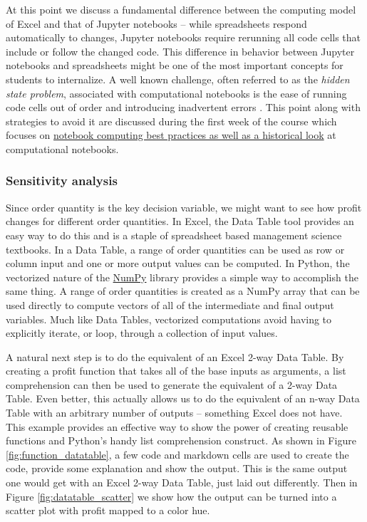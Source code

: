 \documentclass[ited,blindrev]{informs3}              %
\begin{document}
At this point we discuss a fundamental difference between the computing model of Excel and that of Jupyter notebooks -- while spreadsheets respond automatically to changes, Jupyter notebooks require rerunning all code cells that include or follow the changed code. This difference in behavior between Jupyter notebooks and spreadsheets might be one of the most important concepts for students to internalize. A well known challenge, often referred to as the \textit{hidden state problem}, associated with computational notebooks is the ease of running code cells out of order and introducing inadvertent errors \cite{johnson2020benefits,grusDonNotebooks2018}. This point along with strategies to avoid it are discussed during the first week of the course which focuses on \href{http://www.sba.oakland.edu/faculty/isken/courses/mis6900/jupyter_notebooks.html}{notebook computing best practices as well as a historical look} at computational notebooks.

\subsubsection{Sensitivity analysis}

Since order quantity is the key decision variable, we might want to see how profit changes for different order quantities. In Excel, the Data Table tool provides an easy way to do this and is a staple of spreadsheet based management science textbooks. In a Data Table, a range of order quantities can be used as row or column input and one or more output values can be computed. In Python, the vectorized nature of the \href{https://numpy.org/}{NumPy} library \cite{harris2020array} provides a simple way to accomplish the same thing. A range of order quantities is created as a NumPy array that can be used directly to compute vectors of all of the intermediate and final output variables. Much like Data Tables, vectorized computations avoid having to explicitly iterate, or loop, through a collection of input values.

A natural next step is to do the equivalent of an Excel 2-way Data Table. By creating a profit function that takes all of the base inputs as arguments, a list comprehension can then be used to generate the equivalent of a 2-way Data Table. Even better, this actually allows us to do the equivalent of an n-way Data Table with an arbitrary number of outputs -- something Excel does not have. This example provides an effective way to show the power of creating reusable functions and Python's handy list comprehension construct. As shown in Figure \ref{fig:function_datatable}, a few code and markdown cells are used to create the code, provide some explanation and show the output. This is the same output one would get with an Excel 2-way Data Table, just laid out differently. Then in Figure \ref{fig:datatable_scatter} we show how the output can be turned into a scatter plot with profit mapped to a color hue.
\end{document}
